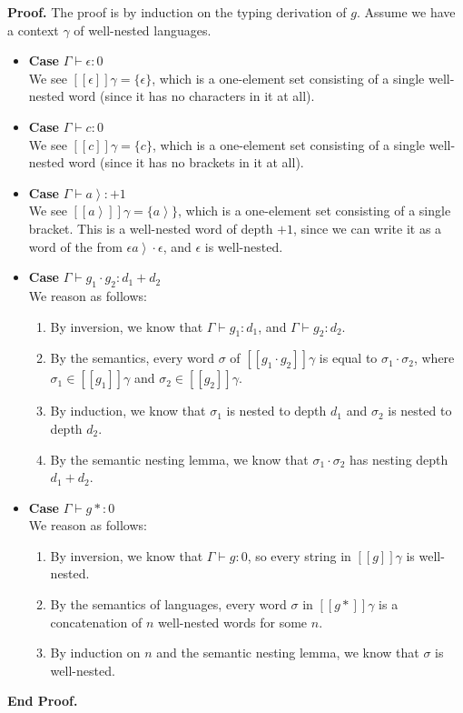 \documentclass{article}
\newcommand{\rgt}[1]{\left.{#1}\right>}
\newcommand{\judgebalance}[3][\Gamma]{{#1} \vdash {#2} : {#3}}
\newcommand{\interp}[1]{[\![{#1}]\!]}
\newcommand{\setof}[1]{\{{#1}\}}
\newenvironment{proof}{\noindent\textbf{Proof.}}
{\noindent\textbf{End Proof.}}
\newenvironment{caseblock}{\begin{itemize}}{\end{itemize}}
\newenvironment{case}[1]{\item \textbf{Case} {#1}\\}{}
\begin{document}
\begin{proof}
The proof is by induction on the typing derivation of $g$. Assume we have a context $\gamma$ of well-nested
languages.

\begin{caseblock}
  \begin{case}{$\judgebalance{\epsilon}{0}$}
    We see $\interp{\epsilon}{\gamma} = \setof{\epsilon}$, which is a one-element set consisting 
    of a single well-nested word (since it has no characters in it at all). 
  \end{case}

  \begin{case}{$\judgebalance{c}{0}$}
    We see $\interp{c}{\gamma} = \setof{c}$, which is a one-element set consisting 
    of a single well-nested word (since it has no brackets in it at all). 
  \end{case}

  \begin{case}{$\judgebalance{\rgt{a}}{+1}$}
    We see $\interp{\rgt{a}}{\gamma} = \setof{\rgt{a}}$, which is a one-element set consisting 
    of a single bracket. This is a well-nested word of depth $+1$, since we can write it as a 
    word of the from $\epsilon\rgt{a}\cdot\epsilon$, and $\epsilon$ is well-nested. 
   \end{case}

  \begin{case}{$\judgebalance{g_1\cdot g_2}{d_1 + d_2}$}
    We reason as follows: 
    \begin{enumerate}
      \item By inversion, we know that $\judgebalance{g_1}{d_1}$, and $\judgebalance{g_2}{d_2}$.
      \item By the semantics, every word $\sigma$ of $\interp{g_1\cdot g_2}\gamma$ is equal to 
        $\sigma_1\cdot\sigma_2$, where $\sigma_1 \in \interp{g_1}\gamma$ and $\sigma_2 \in \interp{g_2}\gamma$. 
      \item By induction, we know that $\sigma_1$ is nested to depth $d_1$ and $\sigma_2$ is nested to depth $d_2$.
      \item By the semantic nesting lemma, we know that $\sigma_1 \cdot \sigma_2$ has nesting depth $d_1 + d_2$. 
    \end{enumerate}
  \end{case}

  \begin{case}{$\judgebalance{g*}{0}$}
    We reason as follows: 
    \begin{enumerate}
      \item By inversion, we know that $\judgebalance{g}{0}$, so every string in $\interp{g}\gamma$ is 
        well-nested. 
      \item By the semantics of languages, every word $\sigma$ in $\interp{g*}\gamma$ is a concatenation of 
        $n$ well-nested words for some $n$. 
      \item By induction on $n$ and the semantic nesting lemma, we know that $\sigma$ is well-nested. 
    \end{enumerate}
  \end{case}


\end{caseblock}
\end{proof}
\end{document}

